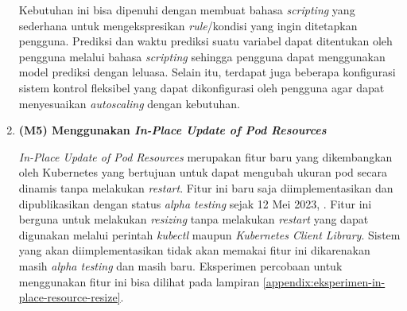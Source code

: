 \begin{enumerate}
    Kebutuhan ini bisa dipenuhi dengan membuat bahasa \textit{scripting} yang sederhana untuk mengekspresikan \textit{rule}/kondisi yang ingin ditetapkan pengguna. Prediksi dan waktu prediksi suatu variabel dapat ditentukan oleh pengguna melalui bahasa \textit{scripting} sehingga pengguna dapat menggunakan model prediksi dengan leluasa. Selain itu, terdapat juga beberapa konfigurasi sistem kontrol fleksibel yang dapat dikonfigurasi oleh pengguna agar dapat menyesuaikan \textit{autoscaling} dengan kebutuhan.

    \item \textbf{(M5) Menggunakan \textit{In-Place Update of Pod Resources}}

    \textit{In-Place Update of Pod Resources} merupakan fitur baru yang dikembangkan oleh Kubernetes yang bertujuan untuk dapat mengubah ukuran pod secara dinamis tanpa melakukan \textit{restart}. Fitur ini baru saja diimplementasikan dan dipublikasikan dengan status \textit{alpha testing} sejak 12 Mei 2023, \parencite{kubeinplaceupdate}. Fitur ini berguna untuk melakukan \textit{resizing} tanpa melakukan \textit{restart} yang dapat digunakan melalui perintah \textit{kubectl} maupun \textit{Kubernetes Client Library}. Sistem yang akan diimplementasikan tidak akan memakai fitur ini dikarenakan masih \textit{alpha testing} dan masih baru. Eksperimen percobaan untuk menggunakan fitur ini bisa dilihat pada lampiran \ref{appendix:eksperimen-in-place-resource-resize}.

\end{enumerate}